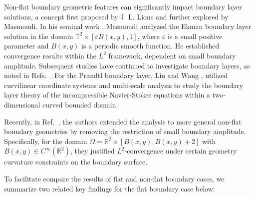 \documentclass[pdflatex,sn-mathphys-num]{sn-jnl}%
\theoremstyle{thmstyleone}%
\theoremstyle{thmstyletwo}%
\theoremstyle{thmstylethree}%
\theoremstyle{thmstyletwo}
\begin{document}
Non-flat boundary geometric features can significantly impact boundary layer solutions, a concept first proposed by J. L. Lions and further explored by Masmoudi. In his seminal work \cite{Masmoudi2000}, Masmoudi analyzed the Ekman boundary layer solution in the domain $\mathbb{T}^2 \times [\varepsilon B(x,y), 1]$, where $\varepsilon$ is a small positive parameter and $B(x,y)$ is a periodic smooth function. He established convergence results within the $L^2$ framework, dependent on small boundary amplitude. 
Subsequent studies have continued to investigate boundary layers, as noted in Refs.~\cite{Bresch2004,Constantin2022,Gerard2017,Gerard2003,Rax2019}. 
For the Prandtl boundary layer, Liu and Wang \cite{Liu2014}, utilized curvilinear coordinate systems and multi-scale analysis to study the boundary layer theory of the incompressible Navier-Stokes equations within a two-dimensional curved bounded domain.



Recently, in Ref.~\cite{Jia2024}, the authors  extended the analysis to more general non-flat boundary geometries by removing the restriction of small boundary amplitude. Specifically, for the domain $\Omega = \mathbb{R}^2 \times [B(x, y), B(x, y) + 2]$ with $B(x,y) \in C^\infty(\mathbb{R}^2)$, they justified $L^2$-convergence under certain geometry curvature constraints on the boundary surface. 


To facilitate compare the results of flat and non-flat boundary cases, we summarize two related  key findings for the flat boundary case below:
\end{document}
